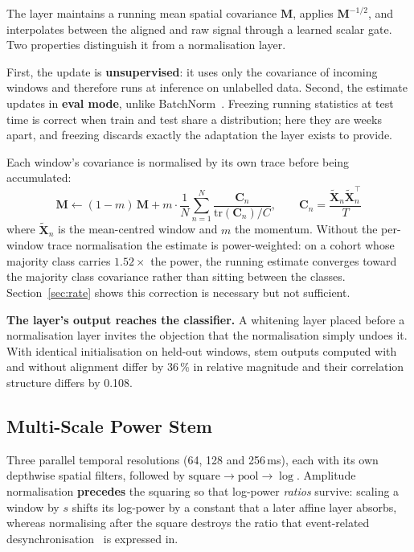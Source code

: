 \documentclass[preprint,12pt]{elsarticle}
\begin{document}
The layer maintains a running mean spatial covariance $\mathbf{M}$, applies
$\mathbf{M}^{-1/2}$, and interpolates between the aligned and raw signal through
a learned scalar gate. Two properties distinguish it from a normalisation layer.

First, the update is \textbf{unsupervised}: it uses only the covariance of
incoming windows and therefore runs at inference on unlabelled data. Second, the
estimate updates in \textbf{eval mode}, unlike BatchNorm~\cite{batchnorm}.
Freezing running statistics at test time is correct when train and test share a
distribution; here they are weeks apart, and freezing discards exactly the
adaptation the layer exists to provide.

Each window's covariance is normalised by its own trace before being accumulated:
\begin{equation}
\mathbf{M} \leftarrow (1-m)\,\mathbf{M} + m \cdot
\frac{1}{N}\sum_{n=1}^{N} \frac{\mathbf{C}_n}{\mathrm{tr}(\mathbf{C}_n)/C},
\qquad
\mathbf{C}_n = \frac{\tilde{\mathbf{X}}_n \tilde{\mathbf{X}}_n^{\top}}{T}
\end{equation}
where $\tilde{\mathbf{X}}_n$ is the mean-centred window and $m$ the momentum.
Without the per-window trace normalisation the estimate is power-weighted: on a
cohort whose majority class carries $1.52\times$ the power, the running estimate
converges toward the majority class covariance rather than sitting between the
classes. Section~\ref{sec:rate} shows this correction is necessary but not
sufficient.

\textbf{The layer's output reaches the classifier.} A whitening layer placed
before a normalisation layer invites the objection that the normalisation simply
undoes it. With identical initialisation on held-out windows, stem outputs
computed with and without alignment differ by 36\,\% in relative magnitude and
their correlation structure differs by 0.108.

\subsection{Multi-Scale Power Stem}

Three parallel temporal resolutions (64, 128 and 256\,ms), each with its own
depthwise spatial filters, followed by
$\mathrm{square} \rightarrow \mathrm{pool} \rightarrow \log$. Amplitude
normalisation \textbf{precedes} the squaring so that log-power \emph{ratios}
survive: scaling a window by $s$ shifts its log-power by a constant that a later
affine layer absorbs, whereas normalising after the square destroys the ratio
that event-related desynchronisation~\cite{erd} is expressed in.
\end{document}
